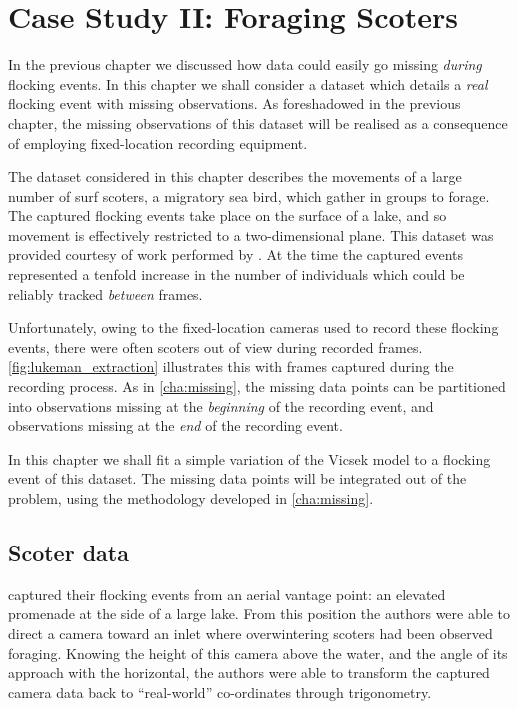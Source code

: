 \graphicspath{{fig/scoters/}}

\chapter{Case Study II: Foraging Scoters}
\label{cha:scoters}

In the previous chapter we discussed how data could easily go missing
\emph{during} flocking events. In this chapter we shall consider a dataset
which details a \emph{real} flocking event with missing observations. As
foreshadowed in the previous chapter, the missing observations of this dataset
will be realised as a consequence of employing fixed-location recording
equipment.

The dataset considered in this chapter describes the movements of a large
number of surf scoters, a migratory sea bird, which gather in groups to forage.
The captured flocking events take place on the surface of a lake, and so
movement is effectively restricted to a two-dimensional plane. This dataset was
provided courtesy of work performed by \textcite{lukeman09,lukeman10}. At the
time the captured events represented a tenfold increase in the number of
individuals which could be reliably tracked \emph{between} frames.

Unfortunately, owing to the fixed-location cameras used to record these
flocking events, there were often scoters out of view during recorded frames.
\cref{fig:lukeman_extraction} illustrates this with frames captured during the
recording process. As in \cref{cha:missing}, the missing data points can be
partitioned into observations missing at the \emph{beginning} of the recording
event, and observations missing at the \emph{end} of the recording event.

In this chapter we shall fit a simple variation of the Vicsek model to a
flocking event of this dataset. The missing data points will be integrated out
of the problem, using the methodology developed in \cref{cha:missing}.

\section{Scoter data}

\textcite{lukeman10} captured their flocking events from an aerial vantage
point: an elevated promenade at the side of a large lake. From this position
the authors were able to direct a camera toward an inlet where overwintering
scoters had been observed foraging. Knowing the height of this camera above the
water, and the angle of its approach with the horizontal, the authors were able
to transform the captured camera data back to ``real-world'' co-ordinates
through trigonometry.

